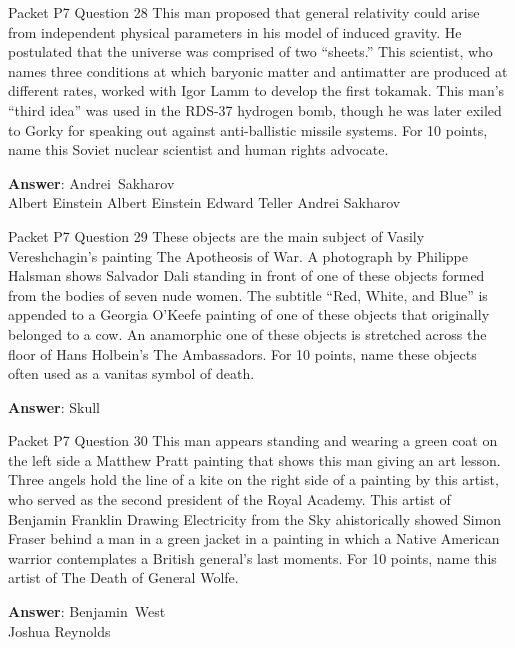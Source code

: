 \begin{frame}{Packet P7 Question 28}
This man proposed that general relativity could arise from independent physical parameters in his model   of induced gravity. He postulated that the universe was comprised of two “sheets.” This scientist,   who names three conditions at which baryonic matter and antimatter are produced at different rates, worked with Igor Lamm to develop the first tokamak. This man’s “third idea” was used in the RDS-37 hydrogen bomb, though   he was later exiled to Gorky for speaking out against anti-ballistic missile systems. For 10 points, name this Soviet nuclear scientist and   human rights advocate.  

\textbf{Answer}: Andrei\ Sakharov\\
 Albert Einstein
 Albert Einstein
 Edward Teller
 Andrei Sakharov
\end{frame}

\begin{frame}{Packet P7 Question 29}
These objects are the main subject of Vasily Vereshchagin’s painting   The Apotheosis of War. A photograph by Philippe Halsman shows Salvador Dali standing in front of one of these objects formed from the bodies of seven nude women. The subtitle “Red, White, and Blue” is appended to a Georgia O’Keefe painting of one of these objects that originally belonged to a cow. An anamorphic one of these objects is stretched across the floor of Hans Holbein’s The Ambassadors. For 10 points,     name these objects often used as a vanitas   symbol of death.

\textbf{Answer}: Skull\\
\end{frame}

\begin{frame}{Packet P7 Question 30}
This man appears standing and wearing a green coat on the left side a Matthew Pratt painting that shows this man giving an art lesson. Three angels hold the line of a kite on the right side of a painting by this artist, who served as the second president of the   Royal Academy. This   artist of Benjamin Franklin Drawing Electricity from the Sky   ahistorically showed Simon Fraser behind   a man in a green jacket in a painting in which a Native American   warrior contemplates a British general’s last moments. For 10 points, name this artist of The Death of General Wolfe.

\textbf{Answer}: Benjamin\ West\\
 Joshua Reynolds
\end{frame}

